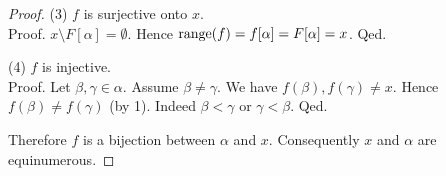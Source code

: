 \documentclass[../set-theory.tex]{subfiles}
\begin{document}
\begin{forthel}
\begin{proof}
      (3) $f$ is surjective onto $x$. \\
      Proof.
        $x \setminus F[\alpha] = \emptyset$.
        Hence $\operatorname{range}(f)
          = f[\alpha]
          = F[\alpha]
          = x$.
      Qed.

      (4) $f$ is injective. \\
      Proof.
        Let $\beta, \gamma \in \alpha$.
        Assume $\beta \neq \gamma$.
        We have $f(\beta), f(\gamma) \neq x$.
        Hence $f(\beta) \neq f(\gamma)$ (by 1).
        Indeed $\beta < \gamma$ or $\gamma < \beta$.
      Qed.

      Therefore $f$ is a bijection between $\alpha$ and $x$.
      Consequently $x$ and $\alpha$ are equinumerous.
    \end{proof}
  \end{forthel}
\end{document}
